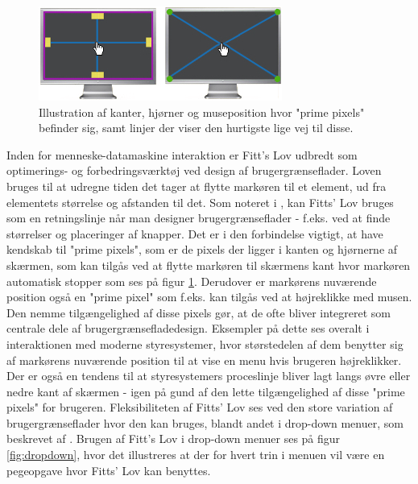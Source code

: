 \begin{figure}
	\centering
	\includegraphics[width=\linewidth]{images/illustrations/prime_pixels}
	\caption{Illustration af kanter, hjørner og museposition hvor "prime pixels" befinder sig, samt linjer der viser den hurtigste lige vej til disse.}
	\label{fig:primepixels}
\end{figure}

Inden for menneske-datamaskine interaktion er Fitt's Lov udbredt som optimerings- og forbedringsværktøj ved design af brugergrænseflader. Loven bruges til at udregne tiden det tager at flytte markøren til et element, ud fra elementets størrelse og afstanden til det. Som noteret i \cite{karafillis2012}, kan Fitts' Lov bruges som en retningslinje når man designer brugergrænseflader - f.eks. ved at finde størrelser og placeringer af knapper. Det er i den forbindelse vigtigt, at have kendskab til "prime pixels", som er de pixels der ligger i kanten og hjørnerne af skærmen, som kan tilgås ved at flytte markøren til skærmens kant hvor markøren automatisk stopper som ses på figur \ref{fig:primepixels}. Derudover er markørens nuværende position også en "prime pixel" som f.eks. kan tilgås ved at højreklikke med musen. Den nemme tilgængelighed af disse pixels gør, at de ofte bliver integreret som centrale dele af brugergrænsefladedesign. Eksempler på dette ses overalt i interaktionen med moderne styresystemer, hvor størstedelen af dem benytter sig af markørens nuværende position til at vise en menu hvis brugeren højreklikker. Der er også en tendens til at styresystemers proceslinje bliver lagt langs øvre eller nedre kant af skærmen - igen på gund af den lette tilgængelighed af disse "prime pixels" for brugeren. Fleksibiliteten af Fitts' Lov ses ved den store variation af brugergrænseflader hvor den kan bruges, blandt andet i drop-down menuer, som beskrevet af \cite{accot1997}. Brugen af Fitt's Lov i drop-down menuer ses på figur \ref{fig:dropdown}, hvor det illustreres at der for hvert trin i menuen vil være en pegeopgave hvor Fitts' Lov kan benyttes.\\

